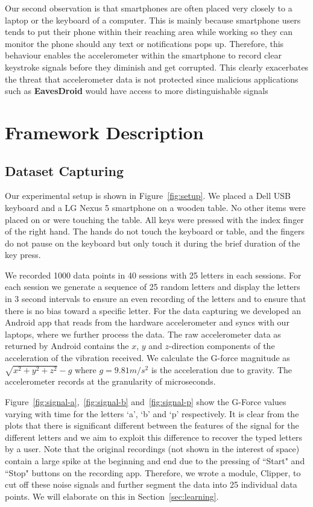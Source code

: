 \documentclass[11pt,conference]{IEEEtran}
\begin{document}
Our second observation is that smartphones are often placed very closely to a laptop or the keyboard of a computer. This is mainly because smartphone users tends to put their phone within their reaching area while working so they can monitor the phone should any text or notifications pops up. Therefore, this behaviour enables the accelerometer within the smartphone to record clear keystroke signals before they diminish and get corrupted. This clearly exacerbates the threat that accelerometer data is not protected since malicious applications such as \textbf{EavesDroid} would have access to more distinguishable signals


\section{Framework Description}

\subsection{Dataset Capturing}
\label{sec:dataset-capturing}
\noindent Our experimental setup is shown in Figure~\ref{fig:setup}. We placed a Dell USB keyboard and a LG Nexus 5 smartphone on a wooden table. No other items were placed on or were touching the table. All keys were pressed with the index finger of the right hand. The hands do not touch the keyboard or table, and the fingers do not pause on the keyboard but only touch it during the brief duration of the key press.

We recorded 1000 data points in 40 sessions with 25 letters in each sessions. For each session we generate a sequence of 25 random letters and display the letters in 3 second intervals to ensure an even recording of the letters and to ensure that there is no bias toward a specific letter. For the data capturing we developed an Android app that reads from the hardware accelerometer and syncs with our laptops, where we further process the data. The raw accelerometer data as returned by Android contains the $x$, $y$ and $z$-direction components of the acceleration of the vibration received. We calculate the G-force magnitude as $\sqrt{x^2+y^2+z^2}-g$ where $g = 9.81 m/s^2$ is the acceleration due to gravity. The accelerometer records at the granularity of microseconds.

\noindent Figure~\ref{fig:signal-a},~\ref{fig:signal-b} and~\ref{fig:signal-p} show the G-Force values varying with time for the
letters `a', `b' and `p' respectively. It is clear from the plots that there is significant different between the features
of the signal for the different letters and we aim to exploit this difference to recover the typed letters by a user.
Note that the original recordings (not shown in the interest of space) contain a large spike at the beginning and end
due to the pressing of ``Start" and ``Stop" buttons on the recording app.
Therefore, we wrote a module, Clipper, to cut off these noise signals and further segment the data into 25 individual data points.
We will elaborate on this in Section~\ref{sec:learning}.
\end{document}
